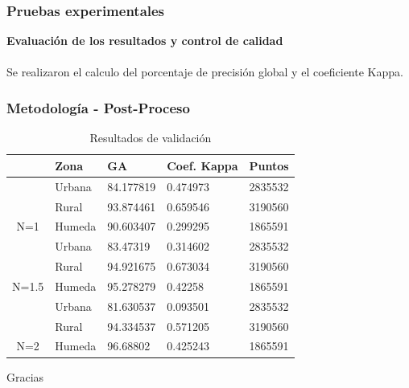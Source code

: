 \documentclass[xcolor=table]{beamer}
\begin{document}

\begin{frame}
	\frametitle{Pruebas experimentales}
	\textbf{Evaluaci\'on de los resultados y control de calidad}\\~\\	
Se realizaron el calculo del porcentaje de precisi\'on global y el coeficiente Kappa.
	
\end{frame}

\begin{frame}
	\frametitle{Metodolog\'ia - Post-Proceso}

\begin{table}[]
	\centering
	\begin{tabular}{|c|l|l|l|l|}
		\hline
		\rowcolor[HTML]{FFFFC7} 
		\multicolumn{1}{|l|}{\cellcolor[HTML]{FFFFC7}Coeficiente de tolerancia} & Zona   & GA        & Coef. Kappa & Puntos  \\ \hline
		& Urbana & 84.177819 & 0.474973    & 2835532 \\ \cline{2-5} 
		& Rural  & 93.874461 & 0.659546    & 3190560 \\ \cline{2-5} 
		\multirow{-3}{*}{N=1}                                                   & Humeda & 90.603407 & 0.299295    & 1865591 \\ \hline
		& Urbana & 83.47319  & 0.314602    & 2835532 \\ \cline{2-5} 
		& Rural  & 94.921675 & 0.673034    & 3190560 \\ \cline{2-5} 
		\multirow{-3}{*}{N=1.5}                                                 & Humeda & 95.278279 & 0.42258     & 1865591 \\ \hline
		& Urbana & 81.630537 & 0.093501    & 2835532 \\ \cline{2-5} 
		& Rural  & 94.334537 & 0.571205    & 3190560 \\ \cline{2-5} 
		\multirow{-3}{*}{N=2}                                                   & Humeda & 96.68802  & 0.425243    & 1865591 \\ \hline
	\end{tabular}
	\caption{Resultados de validaci\'on}
	\label{my-label}
\end{table}
	
\end{frame}


\begin{frame}
\Huge{\centerline{Gracias}}
\end{frame}

\end{document}
